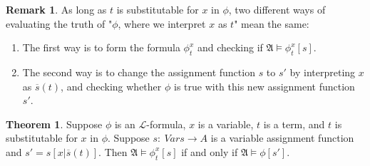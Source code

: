 \documentclass[11pt,letterpaper]{book}
\theoremstyle{definition}
\newtheorem{theorem}{Theorem}[section]
\newtheorem{remark}{Remark}[section]
\begin{document}
\begin{remark}
As long as $t$ is substitutable for $x$ in $\phi$, two different ways of
evaluating the truth of "$\phi$, where we interpret $x$ as $t$" mean the
same:
\begin{enumerate}
\item{The first way is to form the formula $\phi_t ^x$ and checking if
$\mathfrak{A} \models \phi_t ^x [s]$.}
\item{The second way is to change the assignment function $s$ to $s'$ by
interpreting $x$ as $\overline{s} (t)$, and checking whether $\phi$ is
true with this new assignment function $s'$.}
\end{enumerate}

\end{remark}


\begin{theorem}\label{theorem:tech_lemma_2}
Suppose $\phi$ is an $\mathcal{L}$-formula, $x$ is a variable, $t$ is a
term, and $t$ is substitutable for $x$ in $\phi$. Suppose $s: \ Vars
\rightarrow A$ is a variable assignment function and $s' = s[x |
\overline{s} (t)]$. Then $\mathfrak{A} \models \phi_t ^x [s]$ if and
only if $\mathfrak{A} \models \phi [s']$.
\end{theorem}
\end{document}

